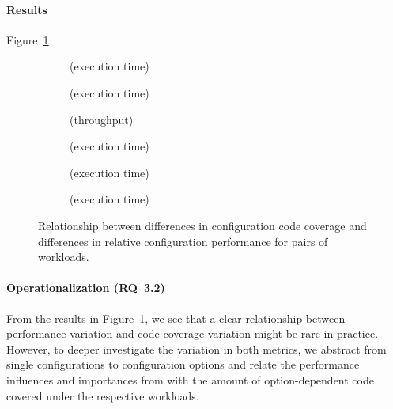 \paragraph*{Results} {\color{blue} Figure~\ref{fig:diff_config}}\\

\begin{figure}
	\centering
	\begin{subfigure}{0.49\textwidth}
		\centering
		\caption{\batik (execution time)}
	\end{subfigure}
	\begin{subfigure}{0.49\textwidth}
		\centering
		\caption{\dconvert (execution time)}
	\end{subfigure}
	\begin{subfigure}{0.49\textwidth}
		\centering
		\caption{\htwo (throughput)}
	\end{subfigure}
	\begin{subfigure}{0.49\textwidth}
		\centering
		\caption{\jumper (execution time)}
	\end{subfigure}
	\begin{subfigure}{0.49\textwidth}
		\centering
		\caption{\jadx (execution time)}
	\end{subfigure}
	\begin{subfigure}{0.49\textwidth}
		\centering
		\caption{\kanzi (execution time)}
	\end{subfigure}
	\caption{Relationship between differences in configuration code coverage and differences in relative configuration performance for pairs of workloads.}
	\label{fig:diff_config}
\end{figure}



\paragraph*{Operationalization (RQ~3.2)}
From the results in Figure~\ref{fig:diff_config}, we see that a clear relationship between performance variation and code coverage variation might be rare in practice. However, to deeper investigate the variation in both metrics, we abstract from single configurations to configuration options and relate the performance influences and importances from  with the amount of option-dependent code covered under the respective workloads.

